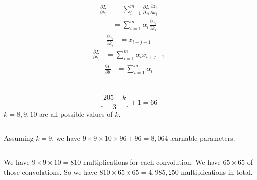 \documentclass[11pt]{scrartcl} %
\begin{document}
\subsection{} %
\begin{equation}
	\begin{aligned}
	\frac{\partial L}{\partial k_j} &= \sum_{i=1}^{m} \frac{\partial L}{\partial z_i} \frac{\partial z_i}{\partial k_j} \\
	&= \sum_{i=1}^{m} \alpha_i \frac{\partial z_i}{\partial k_j} 
	\end{aligned}
\end{equation}
\begin{equation}
	\begin{aligned}
	\frac{\partial z_i}{\partial k_j} &= x_{i+j-1}
	\end{aligned}
\end{equation}
\begin{equation}
	\begin{aligned}
	\frac{\partial L}{\partial k_j} &= \sum_{i=1}^{m} \alpha_i x_{i+j-1} 
	\end{aligned}
\end{equation}
\begin{equation}
	\begin{aligned}
	\frac{\partial L}{\partial b} &= \sum_{i=1}^{m} \alpha_i
	\end{aligned}
\end{equation}
\section{} %
\subsection{} %
\begin{equation}
\lfloor \frac{205-k}{3} \rfloor + 1 = 66
\end{equation}
$ k = 8, 9, 10$ are all possible values of $ k $.
\subsection{} %
Assuming $ k = 9 $, we have $ 9 \times 9 \times 10 \times 96 + 96 = 8, 064 $ learnable parameters.
\subsection{} %
We have $ 9 \times 9 \times 10 = 810 $ multiplications for each convolution. 
We have $ 65 \times 65 $ of those convolutions. So we have $ 810 \times 65 \times 65 = 4, 985, 250 $ multiplications in total.
\end{document}
